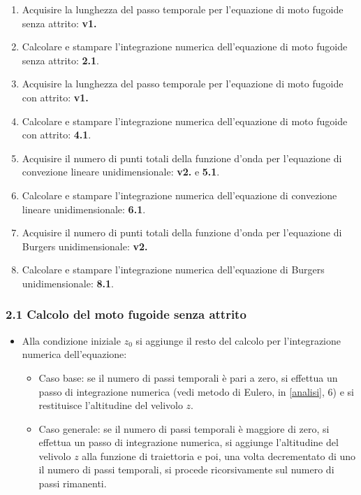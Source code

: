 \begin{enumerate}
\item Acquisire la lunghezza del passo temporale per l'equazione di moto fugoide senza attrito: \textbf{v1.}
\item Calcolare e stampare l'integrazione numerica dell'equazione di moto fugoide senza attrito: \textbf{2.1}.
\item Acquisire la lunghezza del passo temporale per l'equazione di moto fugoide con attrito: \textbf{v1.}
\item Calcolare e stampare l'integrazione numerica dell'equazione di moto fugoide con attrito: \textbf{4.1}.
\item Acquisire il numero di punti totali della funzione d'onda per l'equazione di convezione lineare unidimensionale: \textbf{v2.} e \textbf{5.1}.
\item Calcolare e stampare l'integrazione numerica dell'equazione di convezione lineare unidimensionale: \textbf{6.1}.
\item Acquisire il numero di punti totali della funzione d'onda per l'equazione di Burgers unidimensionale: \textbf{v2.}
\item Calcolare e stampare l'integrazione numerica dell'equazione di Burgers unidimensionale: \textbf{8.1}.
\end{enumerate}

\subsubsection*{2.1 Calcolo del moto fugoide senza attrito} 
\begin{itemize}
\item Alla condizione iniziale $z_0$ si aggiunge il resto del calcolo per l'integrazione numerica dell'equazione:
\begin{itemize}
\item Caso base: se il numero di passi temporali è pari a zero, si effettua un passo di integrazione numerica (vedi metodo di Eulero, in \ref{analisi}, 6) e si restituisce l'altitudine del velivolo $z$.
\item Caso generale: se il numero di passi temporali è maggiore di zero, si effettua un passo di integrazione numerica, si aggiunge l'altitudine del velivolo $z$ alla funzione di traiettoria e poi, una volta decrementato di uno il numero di passi temporali, si procede ricorsivamente sul numero di passi rimanenti. 
\end{itemize}
\end{itemize}

